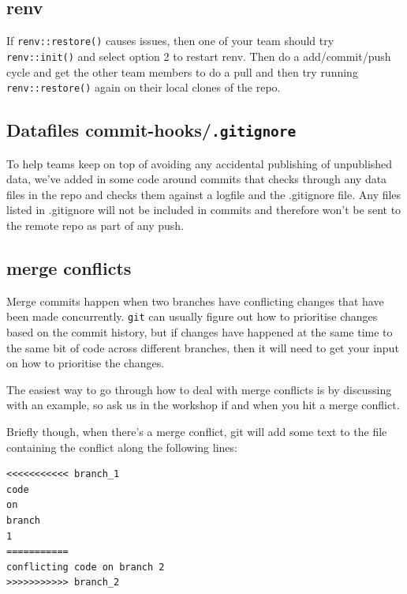 \documentclass[
  12pt,
]{article}
\begin{document}
\hypertarget{renv}{%
\subsection{renv}\label{renv}}

If \texttt{renv::restore()} causes issues, then one of your team should
try \texttt{renv::init()} and select option 2 to restart renv. Then do a
add/commit/push cycle and get the other team members to do a pull and
then try running \texttt{renv::restore()} again on their local clones of
the repo.

\hypertarget{datafiles-commit-hooks.gitignore}{%
\subsection{\texorpdfstring{Datafiles
commit-hooks/\texttt{.gitignore}}{Datafiles commit-hooks/.gitignore}}\label{datafiles-commit-hooks.gitignore}}

To help teams keep on top of avoiding any accidental publishing of
unpublished data, we've added in some code around commits that checks
through any data files in the repo and checks them against a logfile and
the .gitignore file. Any files listed in .gitignore will not be included
in commits and therefore won't be sent to the remote repo as part of any
push.

\hypertarget{merge-conflicts}{%
\subsection{merge conflicts}\label{merge-conflicts}}

Merge commits happen when two branches have conflicting changes that
have been made concurrently. \texttt{git} can usually figure out how to
prioritise changes based on the commit history, but if changes have
happened at the same time to the same bit of code across different
branches, then it will need to get your input on how to prioritise the
changes.

The easiest way to go through how to deal with merge conflicts is by
discussing with an example, so ask us in the workshop if and when you
hit a merge conflict.

Briefly though, when there's a merge conflict, git will add some text to
the file containing the conflict along the following lines:

\begin{verbatim}
<<<<<<<<<<< branch_1
code 
on 
branch 
1
===========
conflicting code on branch 2
>>>>>>>>>>> branch_2
\end{verbatim}
\end{document}
